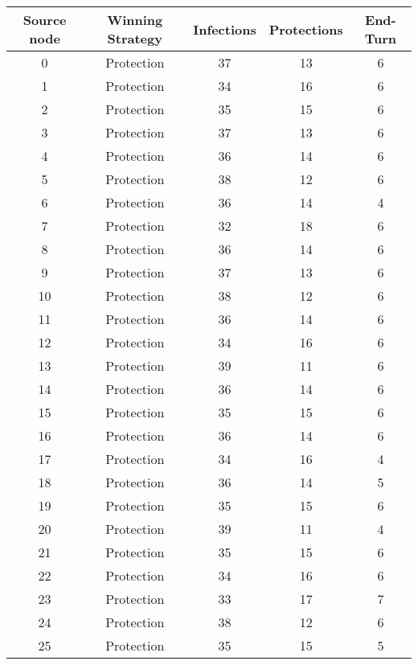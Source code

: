 \documentclass[results.tex]{subfiles}
\begin{document}
\begin{center}
  \begin{tabular}{| c || c | c | c | c |}
    \hline
    {\bfseries Source node} & {\bfseries Winning Strategy} & {\bfseries Infections} & {\bfseries Protections} & {\bfseries End-Turn} \\  %
    \hline\hline
    0 & Protection & 37 & 13 & 6 \\ 
    \hline
    1 & Protection & 34 & 16 & 6 \\ 
    \hline
    2 & Protection & 35 & 15 & 6 \\ 
    \hline
    3 & Protection & 37 & 13 & 6 \\ 
    \hline
    4 & Protection & 36 & 14 & 6 \\ 
    \hline
    5 & Protection & 38 & 12 & 6 \\ 
    \hline
    6 & Protection & 36 & 14 & 4 \\ 
    \hline
    7 & Protection & 32 & 18 & 6 \\ 
    \hline
    8 & Protection & 36 & 14 & 6 \\ 
    \hline
    9 & Protection & 37 & 13 & 6 \\ 
    \hline
    10 & Protection & 38 & 12 & 6 \\ 
    \hline
    11 & Protection & 36 & 14 & 6 \\ 
    \hline
    12 & Protection & 34 & 16 & 6 \\ 
    \hline
    13 & Protection & 39 & 11 & 6 \\ 
    \hline
    14 & Protection & 36 & 14 & 6 \\ 
    \hline
    15 & Protection & 35 & 15 & 6 \\ 
    \hline
    16 & Protection & 36 & 14 & 6 \\ 
    \hline
    17 & Protection & 34 & 16 & 4 \\ 
    \hline
    18 & Protection & 36 & 14 & 5 \\ 
    \hline
    19 & Protection & 35 & 15 & 6 \\ 
    \hline
    20 & Protection & 39 & 11 & 4 \\ 
    \hline
    21 & Protection & 35 & 15 & 6 \\ 
    \hline
    22 & Protection & 34 & 16 & 6 \\ 
    \hline
    23 & Protection & 33 & 17 & 7 \\ 
    \hline
    24 & Protection & 38 & 12 & 6 \\ 
    \hline
    25 & Protection & 35 & 15 & 5 \\ 

\end{tabular}
\end{center}
\end{document}
